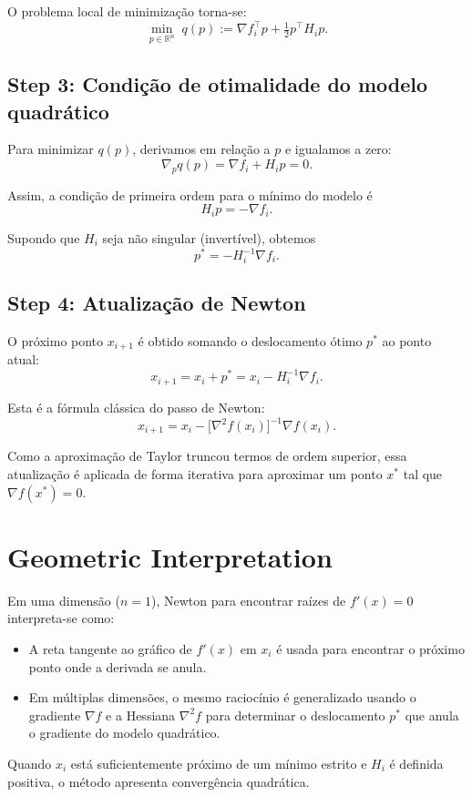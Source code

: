 \documentclass[9pt,a4paper]{extarticle}
\begin{document}
O problema local de minimização torna-se:
\[
\min_{p \in \mathbb{R}^n} \;
q(p) := \nabla f_i^\top p + \tfrac12 p^\top H_i p.
\]

\subsection*{Step 3: Condição de otimalidade do modelo quadrático}

Para minimizar $q(p)$, derivamos em relação a $p$ e igualamos a zero:
\[
\nabla_p q(p)
= \nabla f_i + H_i p = 0.
\]

Assim, a condição de primeira ordem para o mínimo do modelo é
\[
H_i p = - \nabla f_i.
\]

Supondo que $H_i$ seja não singular (invertível), obtemos
\[
p^* = - H_i^{-1} \nabla f_i.
\]

\subsection*{Step 4: Atualização de Newton}

O próximo ponto $x_{i+1}$ é obtido somando o deslocamento ótimo $p^*$ ao ponto atual:
\[
x_{i+1} = x_i + p^*
= x_i - H_i^{-1} \nabla f_i.
\]

Esta é a fórmula clássica do passo de Newton:
\[
\boxed{
x_{i+1} = x_i - \bigl[\nabla^2 f(x_i)\bigr]^{-1} \nabla f(x_i).
}
\]

Como a aproximação de Taylor truncou termos de ordem superior, essa atualização
é aplicada de forma iterativa para aproximar um ponto $x^*$ tal que $\nabla f(x^*)=0$.

\section{Geometric Interpretation}

Em uma dimensão ($n=1$), Newton para encontrar raízes de $f'(x)=0$ interpreta-se
como:
\begin{itemize}
    \item A reta tangente ao gráfico de $f'(x)$ em $x_i$ é usada para encontrar
          o próximo ponto onde a derivada se anula.
    \item Em múltiplas dimensões, o mesmo raciocínio é generalizado usando o
          gradiente $\nabla f$ e a Hessiana $\nabla^2 f$ para determinar o
          deslocamento $p^*$ que anula o gradiente do modelo quadrático.
\end{itemize}

Quando $x_i$ está suficientemente próximo de um mínimo estrito e $H_i$ é
definida positiva, o método apresenta convergência quadrática.
\end{document}
